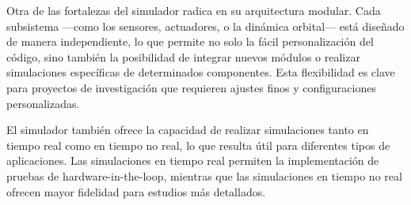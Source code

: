 Otra de las fortalezas del simulador radica en su arquitectura modular. Cada subsistema —como los sensores, actuadores, o la dinámica orbital— está diseñado de manera independiente, lo que permite no solo la fácil personalización del código, sino también la posibilidad de integrar nuevos módulos o realizar simulaciones específicas de determinados componentes. Esta flexibilidad es clave para proyectos de investigación que requieren ajustes finos y configuraciones personalizadas.

El simulador también ofrece la capacidad de realizar simulaciones tanto en tiempo real como en tiempo no real, lo que resulta útil para diferentes tipos de aplicaciones. Las simulaciones en tiempo real permiten la implementación de pruebas de hardware-in-the-loop, mientras que las simulaciones en tiempo no real ofrecen mayor fidelidad para estudios más detallados.